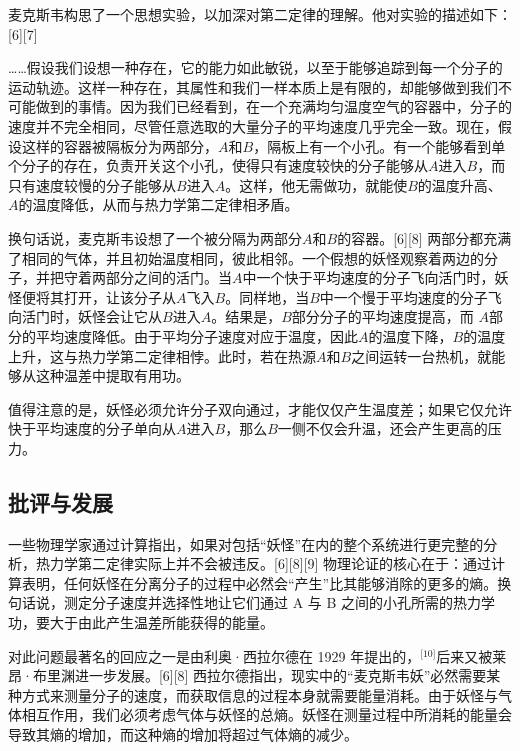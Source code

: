 麦克斯韦构思了一个思想实验，以加深对第二定律的理解。他对实验的描述如下：[6][7]

……假设我们设想一种存在，它的能力如此敏锐，以至于能够追踪到每一个分子的运动轨迹。这样一种存在，其属性和我们一样本质上是有限的，却能够做到我们不可能做到的事情。因为我们已经看到，在一个充满均匀温度空气的容器中，分子的速度并不完全相同，尽管任意选取的大量分子的平均速度几乎完全一致。现在，假设这样的容器被隔板分为两部分，$A$和$B$，隔板上有一个小孔。有一个能够看到单个分子的存在，负责开关这个小孔，使得只有速度较快的分子能够从$A$进入$B$，而只有速度较慢的分子能够从$B$进入$A$。这样，他无需做功，就能使$B$的温度升高、$A$的温度降低，从而与热力学第二定律相矛盾。

换句话说，麦克斯韦设想了一个被分隔为两部分$A$和$B$的容器。[6][8] 两部分都充满了相同的气体，并且初始温度相同，彼此相邻。一个假想的妖怪观察着两边的分子，并把守着两部分之间的活门。当$A$中一个快于平均速度的分子飞向活门时，妖怪便将其打开，让该分子从$A$飞入$B$。同样地，当$B$中一个慢于平均速度的分子飞向活门时，妖怪会让它从$B$进入$A$。结果是，$B$部分分子的平均速度提高，而 $A$部分的平均速度降低。由于平均分子速度对应于温度，因此$A$的温度下降，$B$的温度上升，这与热力学第二定律相悖。此时，若在热源$A$和$B$之间运转一台热机，就能够从这种温差中提取有用功。

值得注意的是，妖怪必须允许分子双向通过，才能仅仅产生温度差；如果它仅允许快于平均速度的分子单向从$A$进入$B$，那么$B$一侧不仅会升温，还会产生更高的压力。
\subsection{批评与发展}
一些物理学家通过计算指出，如果对包括“妖怪”在内的整个系统进行更完整的分析，热力学第二定律实际上并不会被违反。[6][8][9] 物理论证的核心在于：通过计算表明，任何妖怪在分离分子的过程中必然会“产生”比其能够消除的更多的熵。换句话说，测定分子速度并选择性地让它们通过 A 与 B 之间的小孔所需的热力学功，要大于由此产生温差所能获得的能量。

对此问题最著名的回应之一是由利奥·西拉尔德在 1929 年提出的，\(^\text{[10]}\)后来又被莱昂·布里渊进一步发展。[6][8] 西拉尔德指出，现实中的“麦克斯韦妖”必然需要某种方式来测量分子的速度，而获取信息的过程本身就需要能量消耗。由于妖怪与气体相互作用，我们必须考虑气体与妖怪的总熵。妖怪在测量过程中所消耗的能量会导致其熵的增加，而这种熵的增加将超过气体熵的减少。

